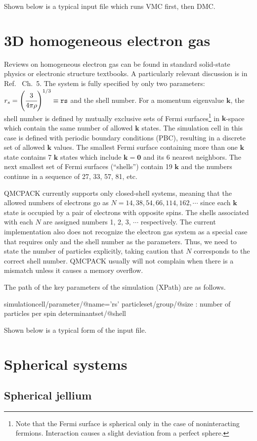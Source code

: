 Shown below is a typical input file which runs VMC first, then DMC.

\section{3D homogeneous electron gas}
Reviews on homogeneous electron gas can be found in standard solid-state physics or electronic structure textbooks.  A particularly relevant discussion is in Ref.~ Ch.~5.  The system is fully specified by only two parameters: $r_s = \left( \cfrac{3}{4 \pi \rho} \right)^{1/3} \equiv \mathtt{rs}$ and the shell number.  For a momentum eigenvalue $\mathbf{k}$, the shell number is defined by mutually exclusive sets of Fermi surfaces\footnote{Note that the Fermi surface is spherical only in the case of noninteracting fermions.  Interaction causes a slight deviation from a perfect sphere.} in $\mathbf{k}$-space which contain the same number of allowed $\mathbf{k}$ states.  The simulation cell in this case is defined with periodic boundary conditions (PBC), resulting in a discrete set of allowed $\mathbf{k}$ values.  The smallest Fermi surface containing more than one $\mathbf{k}$ state contains 7 $\mathbf{k}$ states which include $\mathbf{k} = \mathbf{0}$ and its 6 nearest neighbors.  The next smallest set of Fermi surfaces (``shells'') contain 19 $\mathbf{k}$ and the numbers continue in a sequence of 27, 33, 57, 81, etc.

QMCPACK currently supports only closed-shell systems, meaning that the allowed numbers of electrons go as $N = 14, 38, 54, 66, 114, 162, \cdots$ since each $\mathbf{k}$ state is occupied by a pair of electrons with opposite spins.  The shells associated with each $N$ are assigned numbers 1, 2, 3, $\cdots$ respectively.  The current implementation also does not recognize the electron gas system as a special case that requires only  and the shell number as the parameters.  Thus, we need to state the number of particles explicitly, taking caution that $N$ corresponds to the correct shell number.  QMCPACK usually will not complain when there is a mismatch unless it causes a memory overflow.

The path of the key parameters of the simulation (XPath) are as follows.
\begin{code}
simulationcell/parameter/@name='rs'
particleset/group/@size : number of particles per spin
determinantset/@shell
\end{code}

Shown below is a typical form of the input file.
\section{Spherical systems}
\subsection{Spherical jellium}
%
